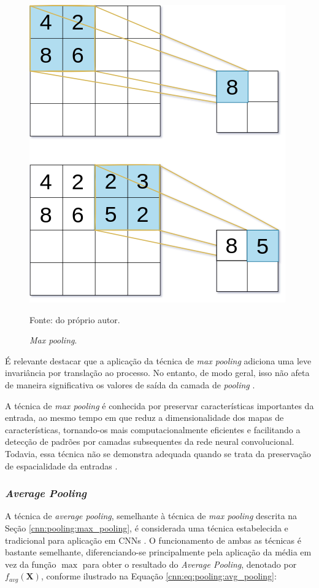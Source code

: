\begin{figure}[H]
    \centering
    \caption{\textit{Max pooling}.}
    \includegraphics[width=0.5\linewidth]{recursos/imagens/deep/max_pooling.png}
    \label{cnn:fig:7}

    Fonte: do próprio autor.
\end{figure}

É relevante destacar que a aplicação da técnica de \textit{max pooling} adiciona uma leve invariância por translação ao processo. No entanto, de modo geral, isso não afeta de maneira significativa os valores de saída da camada de \textit{pooling} \citep{Boureau2010ARecognition}.

A técnica de \textit{max pooling} é conhecida por preservar características importantes da entrada, ao mesmo tempo em que reduz a dimensionalidade dos mapas de características, tornando-os mais computacionalmente eficientes e facilitando a detecção de padrões por camadas subsequentes da rede neural convolucional. Todavia, essa técnica não se demonstra adequada quando se trata da preservação de espacialidade da entradas \citep{Liu2019Multi-LevelNetworks}.

\subsubsection{\textit{Average Pooling}}
\label{cnn:pooling:avg_pooling}
A técnica de \textit{average pooling}, semelhante à técnica de \textit{max pooling} descrita na Seção \ref{cnn:pooling:max_pooling}, é considerada uma técnica estabelecida e tradicional para aplicação em CNNs \citep{Zafar2022ANetworks, Paul2019DimensionalityPooling}. O funcionamento de ambas as técnicas é bastante semelhante, diferenciando-se principalmente pela aplicação da média em vez da função $\max$ para obter o resultado do \textit{Average Pooling}, denotado por $f_{avg}(\boldsymbol{X})$, conforme ilustrado na Equação \ref{cnn:eq:pooling:avg_pooling}:


